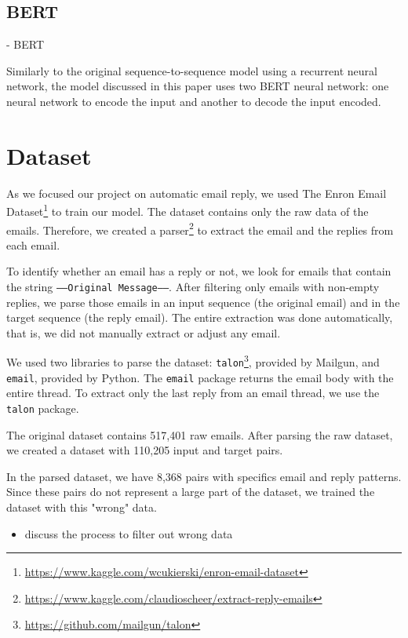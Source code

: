 \documentclass[letterpaper]{article}
\begin{document}
\subsection{BERT}

\cite{DBLP:journals/corr/abs-1810-04805} - BERT

Similarly to the original sequence-to-sequence model using a recurrent neural network, the model discussed in this paper uses two BERT neural network: one neural network to encode the input and another to decode the input encoded. 


\section{Dataset}

As we focused our project on automatic email reply, we used The Enron Email Dataset\footnote{\href{https://www.kaggle.com/wcukierski/enron-email-dataset}{https://www.kaggle.com/wcukierski/enron-email-dataset}} to train our model. The dataset contains only the raw data of the emails. Therefore, we created a parser\footnote{\href{https://www.kaggle.com/claudioscheer/extract-reply-emails}{https://www.kaggle.com/claudioscheer/extract-reply-emails}} to extract the email and the replies from each email.

To identify whether an email has a reply or not, we look for emails that contain the string \texttt{-----Original Message-----}. After filtering only emails with non-empty replies, we parse those emails in an input sequence (the original email) and in the target sequence (the reply email). The entire extraction was done automatically, that is, we did not manually extract or adjust any email.

We used two libraries to parse the dataset: \texttt{talon}\footnote{\href{https://github.com/mailgun/talon}{https://github.com/mailgun/talon}}, provided by Mailgun, and \texttt{email}, provided by Python. The \texttt{email} package returns the email body with the entire thread. To extract only the last reply from an email thread, we use the \texttt{talon} package.

The original dataset contains 517,401 raw emails. After parsing the raw dataset, we created a dataset with 110,205 input and target pairs.

In the parsed dataset, we have 8,368 pairs with specifics email and reply patterns. Since these pairs do not represent a large part of the dataset, we trained the dataset with this "wrong" data.

\begin{itemize}
    \item discuss the process to filter out wrong data
\end{itemize}




\end{document}

